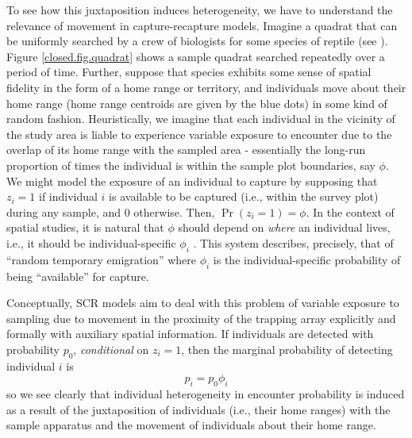 To see how this juxtaposition induces heterogeneity, we have to
understand the relevance of movement in capture-recapture models.
Imagine a quadrat that can be uniformly searched by a crew of
biologists for some species of reptile (see
\citet{royle_young:2008}).  Figure \ref{closed.fig.quadrat} shows a
sample quadrat searched repeatedly over a period of time. Further,
suppose that species exhibits some sense of spatial fidelity in the
form of a home range or territory, and individuals move about their
home range (home range centroids are given by the blue dots) in some
kind of random fashion.
Heuristically, we imagine that each individual in
the vicinity of the study area is liable to experience variable
exposure to encounter due to the overlap of its home range with the
sampled area - essentially the long-run proportion of times the
individual is within the sample plot boundaries, say $\phi$. We
might model the exposure of an individual to capture by supposing that
$z_{i} = 1$ if individual $i$ is available to be captured (i.e.,
within the survey plot) during any sample, and $0$ otherwise. Then,
$\Pr(z_{i}=1) = \phi$.  In the context of spatial studies, it is
natural that $\phi$ should depend on {\it where} an individual lives,
i.e., it should be individual-specific $\phi_{i}$
\citep{chandler_etal:2011}. This system describes, precisely, that of
``random temporary emigration'' \citep{kendall_etal:1997} where $\phi_{i}$
is the individual-specific probability of being ``available'' for
capture.

Conceptually, SCR models aim to deal with
this problem of variable exposure to sampling due to movement in the
proximity of the trapping array explicitly and formally with auxiliary
spatial information.  If individuals are detected with probability
$p_{0}$, {\it conditional} on $z_{i} = 1$, then the marginal
probability of detecting  individual $i$ is
\[
 p_{i} = p_{0}\phi_{i}
\]
so we see clearly that individual heterogeneity in encounter
probability is induced as a result of the juxtaposition of individuals
(i.e., their home ranges) with the sample apparatus and the movement
of individuals about their home range.

